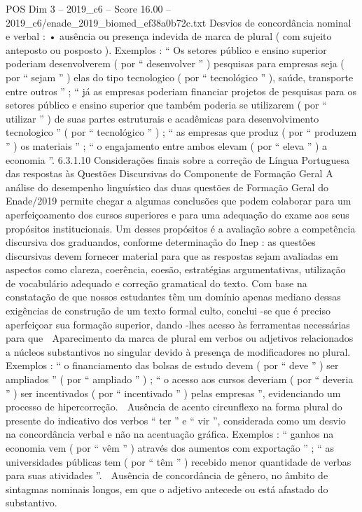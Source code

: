 \begin{textsample}{POS Dim 3 – 2019\_c6 – Score 16.00 – 2019\_c6/enade\_2019\_biomed\_ef38a0b72c.txt}
Desvios de concordância nominal e verbal : • ausência ou presença indevida de marca de plural ( com sujeito anteposto ou posposto ).
Exemplos : “ Os setores público e ensino superior poderiam desenvolverem ( por “ desenvolver ” ) pesquisas para empresas seja ( por “ sejam ” ) elas do tipo tecnologico ( por “ tecnológico ” ), saúde, transporte entre outros ” ; “ já as empresas poderiam financiar projetos de pesquisas para os setores público e ensino superior que também poderia se utilizarem ( por “ utilizar ” ) de suas partes estruturais e acadêmicas para desenvolvimento tecnologico ” ( por “ tecnológico ” ) ; “ as empresas que produz ( por “ produzem ” ) os materiais ” ; “ o engajamento entre ambos elevam ( por “ eleva ” ) a economia ”. 6.3.1.10 Considerações finais sobre a correção de Língua Portuguesa das respostas às Questões Discursivas do Componente de Formação Geral A análise do desempenho linguístico das duas questões de Formação Geral do Enade/2019 permite chegar a algumas conclusões que podem colaborar para um aperfeiçoamento dos cursos superiores e para uma adequação do exame aos seus propósitos institucionais.
Um desses propósitos é a avaliação sobre a competência discursiva dos graduandos, conforme determinação do Inep : as questões discursivas devem fornecer material para que as respostas sejam avaliadas em aspectos como clareza, coerência, coesão, estratégias argumentativas, utilização de vocabulário adequado e correção gramatical do texto.
Com base na constatação de que nossos estudantes têm um domínio apenas mediano dessas exigências de construção de um texto formal culto, conclui -se que é preciso aperfeiçoar sua formação superior, dando -lhes acesso às ferramentas necessárias para que  Aparecimento da marca de plural em verbos ou adjetivos relacionados a núcleos substantivos no singular devido à presença de modificadores no plural.
Exemplos : “ o financiamento das bolsas de estudo devem ( por “ deve ” ) ser ampliados ” ( por “ ampliado ” ) ; “ o acesso aos cursos deveriam ( por “ deveria ” ) ser incentivados ( por “ incentivado ” ) pelas empresas ”, evidenciando um processo de hipercorreção.  Ausência de acento circunflexo na forma plural do presente do indicativo dos verbos “ ter ” e “ vir ”, considerada como um desvio na concordância verbal e não na acentuação gráfica.
Exemplos : “ ganhos na economia vem ( por “ vêm ” ) através dos aumentos com exportação ” ; “ as universidades públicas tem ( por “ têm ” ) recebido menor quantidade de verbas para suas atividades ”.  Ausência de concordância de gênero, no âmbito de sintagmas nominais longos, em que o adjetivo antecede ou está afastado do substantivo.

\end{textsample}
